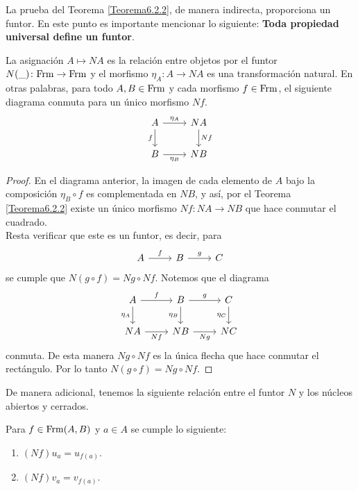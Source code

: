 La prueba del Teorema \ref{Teorema6.2.2}, de manera indirecta, proporciona un funtor. En este punto es importante mencionar lo siguiente: \textbf{Toda propiedad universal define un funtor}.

\begin{thm}\label{Teorema6.2.3}
    La asignación $A\mapsto NA$ es la relación entre objetos por el funtor $N( \_ )\colon \mathrm{Frm} \to\mathrm{Frm}$ y el morfismo $\eta_A\colon A\to NA$ es una transformación natural. En otras palabras, para todo $A, B\in \mathrm{Frm}$ y cada morfismo $f\in \mathrm{Frm}$, el siguiente diagrama conmuta para un único morfismo $Nf$.
    \[\begin{tikzcd}
	A & NA \\
	B & NB
	\arrow["{\eta_A}", from=1-1, to=1-2]
	\arrow["f"', from=1-1, to=2-1]
	\arrow["Nf", from=1-2, to=2-2]
	\arrow["{\eta_B}"', from=2-1, to=2-2]
\end{tikzcd}\]
\end{thm}

\begin{proof}
    En el diagrama anterior, la imagen de cada elemento de $A$ bajo la composición $\eta_B\circ f$ es complementada en $NB$, y así, por el Teorema \ref{Teorema6.2.2} existe un único morfismo $Nf\colon NA\to NB$ que hace conmutar el cuadrado.\\

    Resta verificar que este es un funtor, es decir, para
    \[\begin{tikzcd}
	A & B & C
	\arrow["f", from=1-1, to=1-2]
	\arrow["g", from=1-2, to=1-3]
\end{tikzcd}\]
se cumple que $N(g\circ f)=Ng\circ Nf$. Notemos que el diagrama 
\[\begin{tikzcd}
	A & B & C \\
	NA & NB & NC
	\arrow["f", from=1-1, to=1-2]
	\arrow["{\eta_A}"', from=1-1, to=2-1]
	\arrow["g", from=1-2, to=1-3]
	\arrow["{\eta_B}"', from=1-2, to=2-2]
	\arrow["{\eta_C}"', from=1-3, to=2-3]
	\arrow["Nf"', from=2-1, to=2-2]
	\arrow["Ng"', from=2-2, to=2-3]
\end{tikzcd}\]
conmuta. De esta manera $Ng\circ Nf$ es la única flecha que hace conmutar el rectángulo. Por lo tanto $N(g\circ f)=Ng\circ Nf$.
\end{proof}

De manera adicional, tenemos la siguiente relación entre el funtor $N$ y los núcleos abiertos y cerrados.

\begin{cor}\label{Corolario6.2.4}
    Para $f\in \mathrm{Frm}(A, B)$ y $a\in A$ se cumple lo siguiente:
    \begin{enumerate}
        \item $(Nf)u_a=u_{f(a)}$.
        \item $(Nf)v_a=v_{f(a)}$.
    \end{enumerate}
\end{cor}

